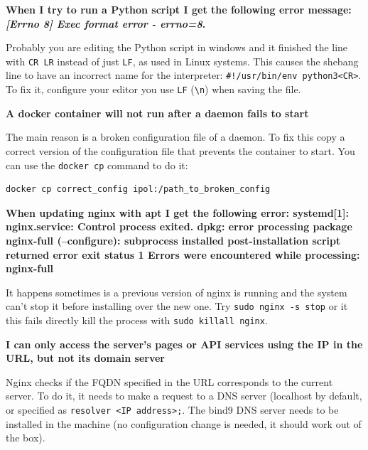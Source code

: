 \documentclass[a4paper,12pt]{article}
\begin{document}
\textbf{When I try to run a Python script I get the following error message: \emph{[Errno 8] Exec format error - errno=8}.}

Probably you are editing the Python script in windows and it finished the line with {\tt CR LR} instead of just {\tt LF}, as used in Linux systems. This causes the shebang line to have an incorrect name for the interpreter: {\tt \#!/usr/bin/env python3<CR>}. To fix it, configure your editor you use {\tt LF} ({\tt \textbackslash n}) when saving the file.
\vspace{0.5cm}

\textbf{A docker container will not run after a daemon fails to start}

The main reason is a broken configuration file of a daemon. To fix this copy a correct version of the configuration file that prevents the container to start. You can use the {\tt docker cp} command to do it:

\begin{verbatim}
docker cp correct_config ipol:/path_to_broken_config
\end{verbatim}

\textbf{When updating nginx with apt I get the following error: systemd[1]: nginx.service: Control process exited. dpkg: error processing package nginx-full (--configure):  subprocess installed post-installation script returned error exit status 1 Errors were encountered while processing:  nginx-full}

It happens sometimes is a previous version of nginx is running and the system can't stop it before installing over the new one. Try {\tt sudo nginx -s stop} or it this fails directly kill the process with {\tt sudo killall nginx}.
\vspace{0.5cm}

\textbf{I can only access the server's pages or API services using the IP in the URL, but not its domain server}

Nginx checks if the FQDN specified in the URL corresponds to the current server. To do it, it needs to make a request to a DNS server (localhost by default, or specified as {\tt resolver <IP address>;}. The bind9 DNS server needs to be installed in the machine (no configuration change is needed, it should work out of the box).



\end{document}
